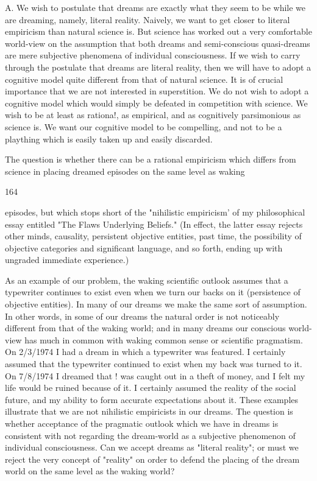 \documentclass[10pt,twoside]{memoir}
\begin{document}
\begin{enumerate}
{{A. We wish to postulate that dreams are exactly what they seem to be 
while we are dreaming, namely, literal reality. Naively, we want to get closer 
to literal empiricism than natural science is. But science has worked out a 
very comfortable world-view on the assumption that both dreams and 
semi-conscious quasi-dreams are mere subjective phenomena of individual 
consciousness. If we wish to carry through the postulate that dreams are 
literal reality, then we will have to adopt a cognitive model quite different 
from that of natural science. It is of crucial importance that we are not 
interested in superstition. We do not wish to adopt a cognitive model which 
would simply be defeated in competition with science. We wish to be at least 
as rationa!, as empirical, and as cognitively parsimonious as science is. We 
want our cognitive model to be compelling, and not to be a plaything which 
is easily taken up and easily discarded. 

The question is whether there can be a rational empiricism which 
differs from science in placing dreamed episodes on the same level as waking 


164 


episodes, but which stops short of the "nihilistic empiricism' of my 
philosophical essay entitled "The Flaws Underlying Beliefs." (In effect, the 
latter essay rejects other minds, causality, persistent objective entities, past 
time, the possibility of objective categories and significant language, and so 
forth, ending up with ungraded immediate experience.) 

As an example of our problem, the waking scientific outlook assumes 
that a typewriter continues to exist even when we turn our backs on it 
(persistence of objective entities). In many of our dreams we make the same 
sort of assumption. In other words, in some of our dreams the natural order 
is not noticeably different from that of the waking world; and in many 
dreams our conscious world-view has much in common with waking 
common sense or scientific pragmatism. On 2/3/1974 I had a dream in which 
a typewriter was featured. I certainly assumed that the typewriter continued 
to exist when my back was turned to it. On 7/8/1974 I dreamed that ! was 
caught out in a theft of money, and I felt my life would be ruined because of 
it. I certainly assumed the reality of the social future, and my ability to form 
accurate expectations about it. These examples illustrate that we are not 
nihilistic empiricists in our dreams. The question is whether acceptance of 
the pragmatic outlook which we have in dreams is consistent with not 
regarding the dream-world as a subjective phenomenon of individual 
consciousness. Can we accept dreams as "literal reality"; or must we reject 
the very concept of "reality" on order to defend the placing of the dream 
world on the same level as the waking world? 

}}
\end{enumerate}
\end{document}
